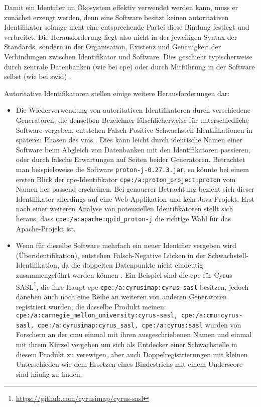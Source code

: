 Damit ein Identifier im Ökosystem effektiv verwendet werden kann, muss er zunächst erzeugt werden, denn eine Software besitzt keinen autoritativen Identifikator solange nicht eine entsprechende Partei diese Bindung festlegt und verbreitet.
Die Herausforderung liegt also nicht in der jeweiligen Syntax der Standards, sondern in der Organisation, Existenz und Genauigkeit der Verbindungen zwischen Identifikator und Software.
Dies geschieht typischerweise durch zentrale Datenbanken (wie bei \acrshort{cpe}) oder durch Mitführung in der Software selbst (wie bei \acrfull{swid}) \autocite{CISA2023}.

Autoritative Identifikatoren stellen einige weitere Herausforderungen dar:

\begin{itemize}
    \item Die Wiederverwendung von autoritativen Identifikatoren durch verschiedene Generatoren, die denselben Bezeichner fälschlicherweise für unterschiedliche Software vergeben, entstehen Falsch-Positive Schwachstell-Identifikationen in späteren Phasen des \acrshort{vms} \autocite{CISA2023}.
    Dies kann leicht durch identische Namen einer Software beim Abgleich von Datenbanken mit den Identifikatoren passieren, oder durch falsche Erwartungen auf Seiten beider Generatoren.
    Betrachtet man beispielsweise die Software \texttt{proton-j-0.27.3.jar}, so könnte bei einem ersten Blick der \acrshort{cpe}-Identifikator \texttt{cpe:/a:proton\_project:proton} vom Namen her passend erscheinen.
    Bei genauerer Betrachtung bezieht sich dieser Identifikator allerdings auf eine Web-Applikation und kein Java-Projekt.
    Erst nach einer weiteren Analyse von potenziellen Identifikatoren stellt sich heraus, dass \texttt{cpe:/a:apache:qpid\_proton-j} die richtige Wahl für das Apache-Projekt ist.

    \item Wenn für dieselbe Software mehrfach ein neuer Identifier vergeben wird (Überidentifikation), entstehen Falsch-Negative Lücken in der Schwachstell-Identifikation, da die doppelten Datenpunkte nicht eindeutig zusammengeführt werden können \autocite{CISA2023}.
    Ein Beispiel sind die \acrshort{cpe} für Cyrus SASL\footnote{\url{https://github.com/cyrusimap/cyrus-sasl}}, die ihre Haupt-\acrshort{cpe} \texttt{cpe:/a:cyrusimap:cyrus-sasl} besitzen, jedoch daneben auch noch eine Reihe an weiteren von anderen Generatoren registriert wurden, die dasselbe Produkt meinen:
    \texttt{cpe:/a:carnegie\_mellon\_university:cyrus-sasl, cpe:/a:cmu:cyrus-sasl, cpe:/a:cyrusimap:cyrus\_sasl, cpe:/a:cyrus:sasl} wurden von Forschern an der \acrfull{cmu} einmal mit ihren ausgeschriebenen Namen und einmal mit ihrem Kürzel vergeben um sich als Entdecker einer Schwachstelle in diesem Produkt zu verewigen, aber auch Doppelregistrierungen mit kleinen Unterschieden wie dem Ersetzen eines Bindestrichs mit einem Underscore sind häufig zu finden.


\end{itemize}
